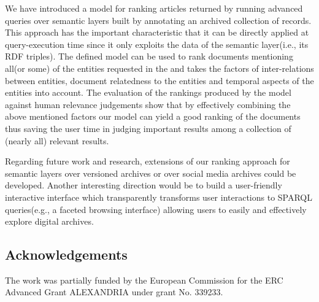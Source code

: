 \documentclass{libtex/llncs}
\begin{document}
We have introduced a model for ranking articles returned by running advanced
queries over semantic layers built by annotating an archived collection of
records. This approach has the important characteristic
that it can be directly applied at query-execution time since
it only exploits the data of the semantic layer(i.e., its RDF triples).
The defined model can be used to rank documents mentioning all(or some)
of the entities requested in the and takes the factors of inter-relations between entities,
document relatedness to the entities and temporal aspects of the entities into account.
The evaluation of the rankings produced by the model against human relevance judgements
show that by effectively combining the above mentioned factors our model can yield a good
ranking of the documents thus saving the user time in judging important results among
a collection of (nearly all) relevant results.

Regarding future work and research, extensions of our ranking approach
for semantic layers over versioned archives or over social media archives
could be developed. Another interesting direction would be to build
a user-friendly interactive interface which transparently transforms user
interactions to SPARQL queries(e.g., a faceted browsing interface)
allowing users to easily and effectively explore digital archives.


\subsection*{Acknowledgements}
The work was partially funded by the European Commission
for the ERC Advanced Grant ALEXANDRIA under grant No. 339233.




\end{document}
